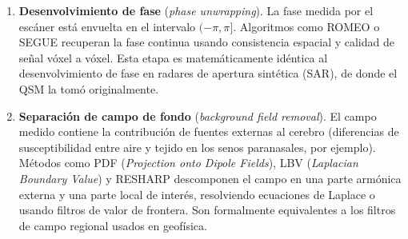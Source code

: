 \documentclass[12pt, a4paper]{article}
\begin{document}
\begin{enumerate}[leftmargin=2em, itemsep=3pt]

  \item \textbf{Desenvolvimiento de fase} (\emph{phase unwrapping}). La fase medida por el escáner está envuelta en el intervalo $(-\pi, \pi]$. Algoritmos como \textsc{ROMEO} o \textsc{SEGUE} recuperan la fase continua usando consistencia espacial y calidad de señal vóxel a vóxel. Esta etapa es matemáticamente idéntica al desenvolvimiento de fase en radares de apertura sintética (SAR), de donde el QSM la tomó originalmente.

  \item \textbf{Separación de campo de fondo} (\emph{background field removal}). El campo medido contiene la contribución de fuentes externas al cerebro (diferencias de susceptibilidad entre aire y tejido en los senos paranasales, por ejemplo). Métodos como \textsc{PDF} (\emph{Projection onto Dipole Fields}), \textsc{LBV} (\emph{Laplacian Boundary Value}) y \textsc{RESHARP} descomponen el campo en una parte armónica externa y una parte local de interés, resolviendo ecuaciones de Laplace o usando filtros de valor de frontera. Son formalmente equivalentes a los filtros de campo regional usados en geofísica.


\end{enumerate}
\end{document}
